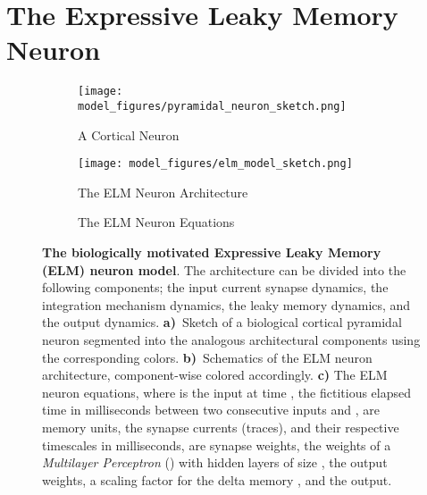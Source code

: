 \documentclass{article} \usepackage{iclr2024_doc_style,times}
\begin{document}
\section{The Expressive Leaky Memory Neuron}
\label{the_elm_neuron}

\begin{figure}[ht]
    \centering
    \hfill
    \begin{minipage}[b]{0.37\textwidth}
        \begin{subfigure}{0.9\textwidth}
            \centering
            \texttt{[image: model\_figures/pyramidal\_neuron\_sketch.png]}
            \caption{A Cortical Neuron}
            \label{fig:a_pyramidal_neuron}
        \end{subfigure}
    \end{minipage}
    \begin{minipage}[b]{0.57\textwidth}
        \begin{subfigure}{0.9\textwidth}
            \centering
            \texttt{[image: model\_figures/elm\_model\_sketch.png]}
            \caption{The ELM Neuron Architecture}
            \label{fig:elm_neuron_architecture_sketch}
        \end{subfigure}
        \begin{subfigure}{0.9\textwidth}
            \centering
            \begin{minipage}[c][0.5\linewidth][c]{\linewidth}
                
            \end{minipage}\vspace{-1em}
            \caption{The ELM Neuron Equations}
        \end{subfigure}
    \end{minipage}
    \caption{\textbf{The biologically motivated Expressive Leaky Memory (ELM) neuron model}. The architecture can be divided into the following components; the input \textcolor{greenVar}{current synapse dynamics}, the \textcolor{orangeVar}{ integration mechanism dynamics}, the \textcolor{blueVar}{leaky memory dynamics}, and the \textcolor{purpleVar}{output dynamics}. \textbf{a)}~Sketch of a biological cortical pyramidal neuron segmented into the analogous architectural components using the corresponding colors. \textbf{b)}~Schematics of the ELM neuron architecture, component-wise colored accordingly. \textbf{c)} The ELM neuron equations, where  is the input at time ,  the fictitious elapsed time in milliseconds between two consecutive inputs  and  ,  are memory units,  the synapse currents (traces),  and  their respective timescales in milliseconds,  are synapse weights,  the weights of a \textit{Multilayer Perceptron} () with  hidden layers of size ,  the output weights,  a scaling factor for the delta memory , and  the output.}
    \label{fig:elm_neuron_sketch_and_equations}
\end{figure}
\end{document}
